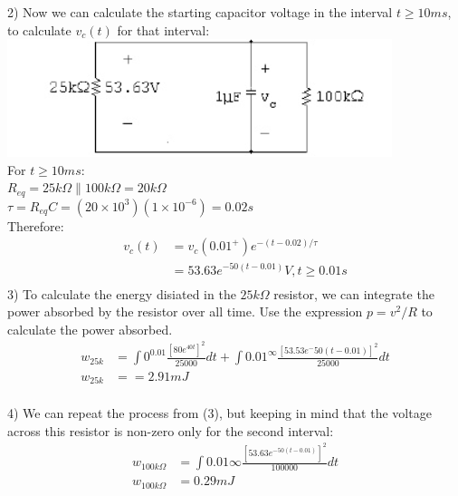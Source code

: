 2) Now we can calculate the starting capacitor voltage in the interval 
$t \geq 10 ms$, to calculate $v_c(t)$ for that interval: \\
\includegraphics{img/c7/a23} \\
For $t \geq 10 ms$: \\
$R_{eq} = 25 k\Omega \parallel 100k\Omega = 20k\Omega $ \\
$ \tau = R_{eq}C = (20 \times 10^{3})(1 \times 10^{-6}) = 0.02 s $\\
Therefore:
\begin{align*}
	v_c(t) &= v_c(0.01^{+})e^{-(t-0.02)/\tau} \\
	&= 53.63e^{-50(t-0.01)} V, t \geq 0.01 s \\
\end{align*}
3) To calculate the energy disiated in the $25 k\Omega$ resistor, we can
integrate the power absorbed by the resistor over all time. Use
the expression $p = v^2/R$ to calculate the power absorbed. 
\begin{align*}
	w_{25k} &= \int{0}^{0.01} \frac{[80e^{40t}]^2}{25000}dt + \int{0.01}^{\infty} \frac{[53.53e^-50(t-0.01)]^2}{25000} dt \\
	w_{25k} &== 2.91 mJ \\
\end{align*}

4) We can repeat the process from (3), but keeping in mind that the voltage
across this resistor is non-zero only for the second interval:
\begin{align*}
	w_{100k\Omega}  &= \int{0.01}{\infty} \frac{[53.63e^{-50(t-0.01)}]^2}{100000} dt \\
	w_{100k\Omega} &= 0.29 mJ \\
\end{align*}


